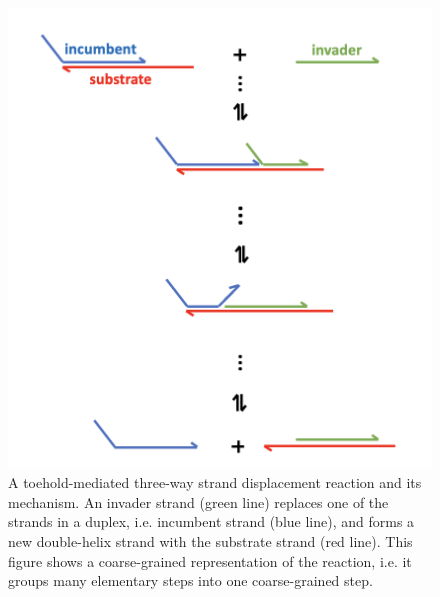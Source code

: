 \documentclass{article}
\begin{document}
\begin{figure}[h]
	\centering
	\vspace*{0.3cm}
	\includegraphics[scale=0.5]{latexplots/Threewayrxn.png}\hspace*{1cm}
	\caption{A toehold-mediated three-way strand displacement reaction and its mechanism. An invader strand (green line) replaces one of the strands in a duplex, i.e. incumbent strand (blue line), and forms a new double-helix strand with the substrate strand (red line). This figure shows a coarse-grained representation of the reaction, i.e. it groups many elementary steps into one coarse-grained step.}
	\vspace*{-.3cm}
	\label{fig:threeway}
\end{figure}
\end{document}

